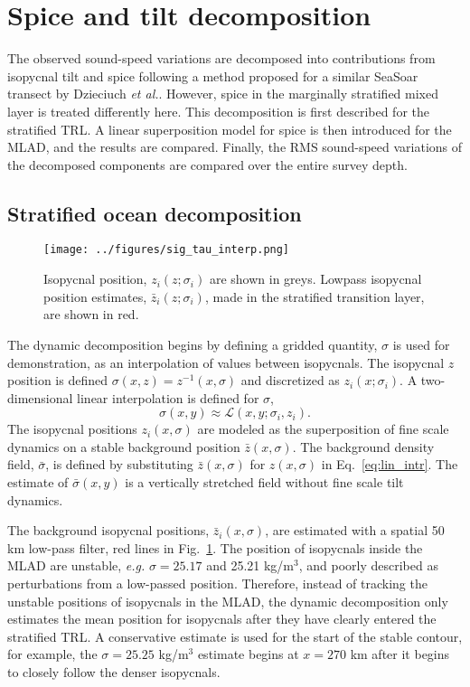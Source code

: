 \documentclass[preprint,NumberedRefs]{JASA}
\begin{document}
\section{\label{sec:decomposition}Spice and tilt decomposition}
The observed sound-speed variations are decomposed into contributions from isopycnal tilt and spice following a method proposed for a similar SeaSoar transect by Dzieciuch \emph{et al.}.\citep{dzieciuch2004} However, spice in the marginally stratified mixed layer is treated differently here. This decomposition is first described for the stratified TRL. A linear superposition model for spice is then introduced for the MLAD, and the results are compared. Finally, the RMS sound-speed variations of the decomposed components are compared over the entire survey depth.

\subsection{Stratified ocean decomposition}
\begin{figure}
\texttt{[image: ../figures/sig\_tau\_interp.png]}
    \caption{\label{fig:cntrs}{Isopycnal position, $z_i(z; \sigma_i)$ are shown in greys. Lowpass isopycnal position estimates, $\bar{z}_i(z; \sigma_i)$, made in the stratified transition layer, are shown in red.}}
\end{figure}

The dynamic decomposition begins by defining a gridded quantity, $\sigma$ is used for demonstration, as an interpolation of values between isopycnals. The isopycnal $z$ position is defined $\sigma(x, z) = z^{-1}(x, \sigma)$ and discretized as $z_i(x; \sigma_i)$. A two-dimensional linear interpolation is defined for $\sigma$,
\begin{equation}
    \sigma(x,y)\approx\mathcal{L}(x, y; \sigma_i, z_i).
    \label{eq:lin_intr}
\end{equation}
The isopycnal positions $z_i(x, \sigma)$ are modeled as the superposition of fine scale dynamics on a stable background position $\bar{z}(x, \sigma)$. The background density field, $\bar{\sigma}$, is defined by substituting $\bar{z}(x, \sigma)$ for $z(x, \sigma)$ in Eq.~\eqref{eq:lin_intr}. The estimate of $\bar{\sigma}(x,y)$ is a vertically stretched field without fine scale tilt dynamics.

The background isopycnal positions, $\bar{z}_i(x, \sigma)$, are estimated with a spatial 50 km low-pass filter, red lines in Fig.~\ref{fig:cntrs}. The position of isopycnals inside the MLAD are unstable, \emph{e.g.} $\sigma=25.17$ and 25.21 kg/m$^3$, and poorly described as perturbations from a low-passed position. Therefore, instead of tracking the unstable positions of isopycnals in the MLAD, the dynamic decomposition only estimates the mean position for isopycnals after they have clearly entered the stratified TRL. A conservative estimate is used for the start of the stable contour, for example, the $\sigma=25.25$ kg/m$^3$ estimate begins at $x=270$ km after it begins to closely follow the denser isopycnals.
\end{document}

